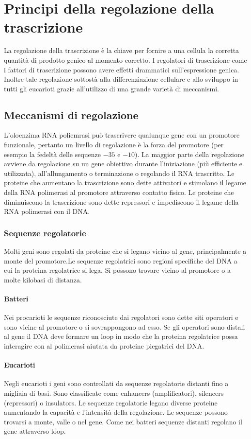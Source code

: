 \section{Principi della regolazione della trascrizione}
La regolazione della trascrizione \`e la chiave per fornire a una cellula la corretta quantit\`a di prodotto genico al momento corretto. I regolatori di trascrizione come i fattori di 
trascrizione possono avere effetti drammatici sull'espressione genica. Inoltre tale regolazione sottost\`a alla differenziazione cellulare e allo sviluppo in tutti gli eucarioti 
grazie all'utilizzo di una grande variet\`a di meccanismi. 
\subsection{Meccanismi di regolazione}
L'oloenzima RNA poliemrasi pu\`o trascrivere qualunque gene con un promotore funzionale, pertanto un livello di regolazione \`e la forza del promotore (per esempio la fedelt\`a delle 
sequenze $-35$ e $-10$). La maggior parte della regolazione avviene da regolazione su un gene obiettivo durante l'iniziazione (pi\`u efficiente e utilizzata), all'allungamento o 
terminazione o regolando il RNA trascritto. Le proteine che aumentano la trascrizione sono dette attivatori e stimolano il legame della RNA polimerasi al promotore attraverso contatto 
fisico. Le proteine che diminuiscono la trascrizione sono dette repressori e impediscono il legame della RNA polimerasi con il DNA. 
\subsubsection{Sequenze regolatorie}
Molti geni sono regolati da proteine che si legano vicino al gene, principalmente a monte del promotore.Le sequenze regolatrici sono regioni specifiche del DNA a cui la proteina 
regolatrice si lega. Si possono trovare vicino al promotore o a molte kilobasi di distanza.
\paragraph{Batteri} 
Nei procarioti le sequenze riconosciute dai regolatori sono dette siti operatori e sono vicine al promotore o si sovrappongono ad esso. Se gli operatori sono distali al gene il DNA
deve formare un loop in modo che la proteina regolatrice possa interagire con al polimerasi aiutata da proteine piegatrici del DNA.
\paragraph{Eucarioti}
Negli eucarioti i geni sono controllati da sequenze regolatorie distanti fino a migliaia di basi. Sono classificate come enhancers (amplificatori), silencers (repressori) o insulators. 
Le sequenze regolatorie legano diverse proteine aumentando la capacit\`a e l'intensit\`a della regolazione. Le sequenze possono trovarsi a monte, valle o nel gene. Come nei batteri 
sequenze distanti regolano il gene attraverso loop.
